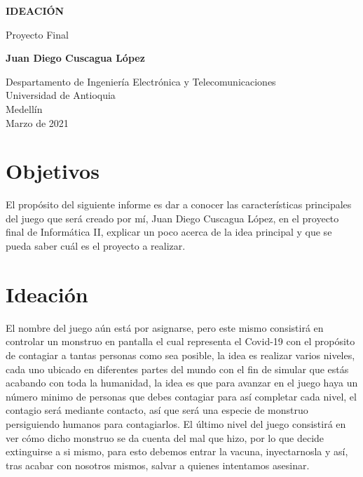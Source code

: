 \documentclass{article}
\begin{document}
\begin{titlepage}
    \begin{center}
        \vspace*{1cm}
            
        \Huge
        \textbf{IDEACIÓN}
            
        \vspace{0.5cm}
        \LARGE
        Proyecto Final
            
        \vspace{1.5cm}
            
        \textbf{Juan Diego Cuscagua López}
            
        \vfill
            
        \vspace{0.8cm}
            
        \Large
        Despartamento de Ingeniería Electrónica y Telecomunicaciones\\
        Universidad de Antioquia\\
        Medellín\\
        Marzo de 2021
            
    \end{center}
\end{titlepage}

\tableofcontents
\newpage
\section{Objetivos}\label{intro}
El propósito del siguiente informe es dar a conocer las características principales del juego que será creado por mí, Juan Diego Cuscagua López, en el proyecto final de Informática II, explicar un poco acerca de la idea principal y que se pueda saber cuál es el proyecto a realizar.

\section{Ideación} \label{contenido}
El nombre del juego aún está por asignarse, pero este mismo consistirá en controlar un monstruo en pantalla el cual representa el Covid-19 con el propósito de contagiar a tantas personas como sea posible, la idea es realizar varios niveles, cada uno ubicado en diferentes partes del mundo con el fin de simular que estás acabando con toda la humanidad, la idea es que para avanzar en el juego haya un número minimo de personas que debes contagiar para así completar cada nivel, el contagio será mediante contacto, así que será una especie de monstruo persiguiendo humanos para contagiarlos. El último nivel del juego consistirá en ver cómo dicho monstruo se da cuenta del mal que hizo, por lo que decide extinguirse a si mismo, para esto debemos entrar la vacuna, inyectarnosla y así, tras acabar con nosotros mismos, salvar a quienes intentamos asesinar.
\end{document}
